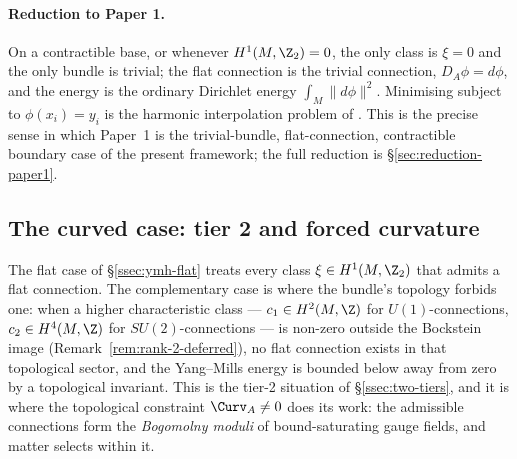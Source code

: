 \paragraph{Reduction to Paper 1.} On a contractible base, or whenever
$H^1(M,\Z_2)=0$, the only class is $\xi=0$ and the only bundle is
trivial; the flat connection is the trivial connection, $D_A\phi=
d\phi$, and the energy is the ordinary Dirichlet energy
$\int_M\|d\phi\|^2$. Minimising subject to $\phi(x_i)=y_i$ is the
harmonic interpolation problem of \cite[Theorem~13.3]{Vasii2026Paper1}.
This is the precise sense in which Paper~1 is the trivial-bundle,
flat-connection, contractible boundary case of the present framework;
the full reduction is \S\ref{sec:reduction-paper1}.

\subsection{The curved case: tier 2 and forced curvature}\label{ssec:ymh-curved}

The flat case of \S\ref{ssec:ymh-flat} treats every class
$\xi\in H^1(M,\Z_2)$ that admits a flat connection. The complementary
case is where the bundle's topology forbids one: when a higher
characteristic class --- $c_1\in H^2(M,\Z)$ for $U(1)$-connections,
$c_2\in H^4(M,\Z)$ for $SU(2)$-connections --- is non-zero outside the
Bockstein image (Remark~\ref{rem:rank-2-deferred}), no flat
connection exists in that topological sector, and the Yang--Mills
energy is bounded below away from zero by a topological invariant.
This is the tier-2 situation of \S\ref{ssec:two-tiers}, and it is
where the topological constraint $\Curv_A\neq 0$ does its work: the
admissible connections form the \emph{Bogomolny moduli} of
bound-saturating gauge fields, and matter selects within it.

